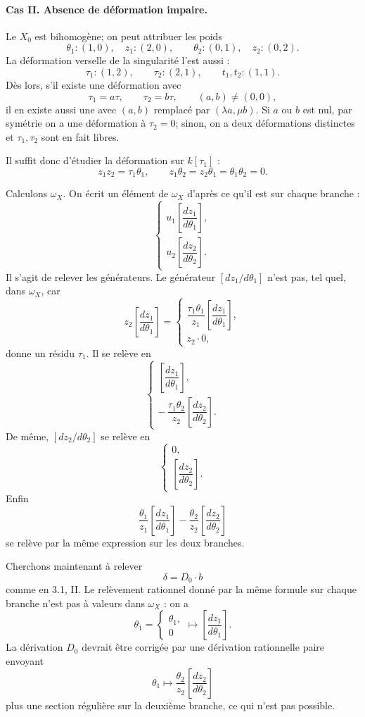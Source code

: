 \documentclass[11pt]{article}
\begin{document}
\paragraph{Cas II. Absence de déformation impaire.}
Le $X_0$ est bihomogène; on peut attribuer les poids
\[
  \theta_1:(1,0),\quad z_1:(2,0),\qquad
  \theta_2:(0,1),\quad z_2:(0,2).
\]
La déformation verselle de la singularité l'est aussi :
\[
  \tau_1:(1,2),\qquad \tau_2:(2,1),\qquad
  t_1,t_2:(1,1).
\]
Dès lors, s'il existe une déformation avec
\[
  \tau_1=a\tau,\qquad \tau_2=b\tau,\qquad (a,b)\ne(0,0),
\]
il en existe aussi une avec $(a,b)$ remplacé par $(\lambda a,\mu b)$. Si $a$ ou $b$ est nul, par symétrie on a une déformation à $\tau_2=0$; sinon, on a deux déformations distinctes et $\tau_1,\tau_2$ sont en fait libres.

Il suffit donc d'étudier la déformation sur $k[\tau_1]$ :
\[
  z_1z_2=\tau_1\theta_1,\qquad
  z_1\theta_2=z_2\theta_1=\theta_1\theta_2=0.
\]

Calculons $\omega_X$. On écrit un élément de $\omega_X$ d'après ce qu'il est sur chaque branche :
\[
  \begin{cases}
  u_1\left[\dfrac{dz_1}{d\theta_1}\right],\\[2mm]
  u_2\left[\dfrac{dz_2}{d\theta_2}\right].
  \end{cases}
\]
Il s'agit de relever les générateurs. Le générateur $\left[dz_1/d\theta_1\right]$ n'est pas, tel quel, dans $\omega_X$, car
\[
 z_2\left[\frac{dz_1}{d\theta_1}\right]
 =
 \begin{cases}
 \dfrac{\tau_1\theta_1}{z_1}\left[\dfrac{dz_1}{d\theta_1}\right],\\[2mm]
 z_2\cdot0,
 \end{cases}
\]
donne un résidu $\tau_1$. Il se relève en
\[
  \begin{cases}
  \left[\dfrac{dz_1}{d\theta_1}\right],\\[2mm]
  -\,\dfrac{\tau_1\theta_2}{z_2}\left[\dfrac{dz_2}{d\theta_2}\right].
  \end{cases}
\]
De même, $\left[dz_2/d\theta_2\right]$ se relève en
\[
  \begin{cases}
  0,\\[1mm]
  \left[\dfrac{dz_2}{d\theta_2}\right].
  \end{cases}
\]
Enfin
\[
  \frac{\theta_1}{z_1}\left[\frac{dz_1}{d\theta_1}\right]
  -
  \frac{\theta_2}{z_2}\left[\frac{dz_2}{d\theta_2}\right]
\]
se relève par la même expression sur les deux branches.

Cherchons maintenant à relever
\[
  \delta=D_0\cdot b
\]
comme en 3.1, II. Le relèvement rationnel donné par la même formule sur chaque branche n'est pas à valeurs dans $\omega_X$ : on a
\[
  \theta_1=
  \begin{cases}
  \theta_1,\\
  0
  \end{cases}
  \longmapsto
  \left[\frac{dz_1}{d\theta_1}\right].
\]
La dérivation $D_0$ devrait être corrigée par une dérivation rationnelle paire envoyant
\[
  \theta_1\longmapsto
  \frac{\theta_2}{z_2}\left[\frac{dz_2}{d\theta_2}\right]
\]
plus une section régulière sur la deuxième branche, ce qui n'est pas possible.
\end{document}
